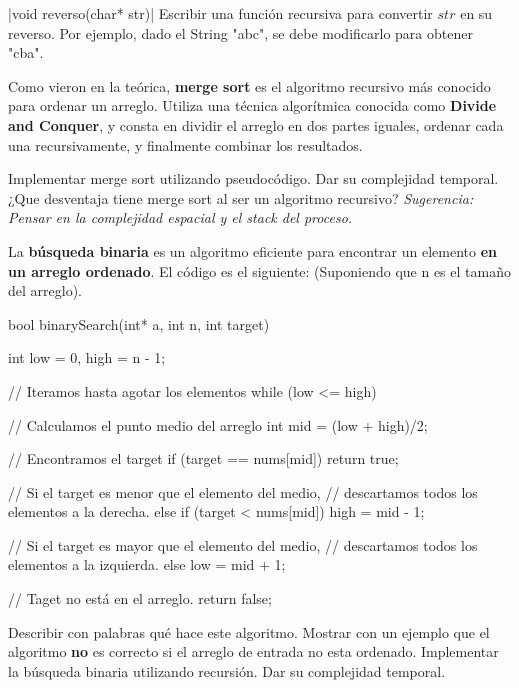 \documentclass[titlepage,oneside]{book}
\begin{document}
	\begin{Exercise}
		|void reverso(char* str)|
        Escribir una función recursiva para convertir $str$ en su reverso. Por ejemplo, dado el String "abc", se debe modificarlo para obtener "cba".
	\end{Exercise}

	\begin{Exercise}
		Como vieron en la teórica, \textbf{merge sort} es el algoritmo recursivo más conocido para ordenar un arreglo. Utiliza una técnica algorítmica conocida como \textbf{Divide and Conquer}, y consta en dividir el arreglo en dos partes iguales, ordenar cada una recursivamente, y finalmente combinar los resultados.

		\Question Implementar merge sort utilizando pseudocódigo. Dar su complejidad temporal.
		\Question ¿Que desventaja tiene merge sort al ser un algoritmo recursivo? \newline\textit{Sugerencia: Pensar en la complejidad espacial y el stack del proceso.}
	\end{Exercise}

\begin{Exercise} La \textbf{búsqueda binaria} es un algoritmo eficiente para encontrar un elemento \textbf{en un arreglo ordenado}. El código es el siguiente: (Suponiendo que n es el tamaño del arreglo).

    \begin{ccode}
    bool binarySearch(int* a, int n, int target)
    {
        int low = 0, high = n - 1;

        // Iteramos hasta agotar los elementos
        while (low <= high)
        {
            // Calculamos el punto medio del arreglo
            int mid = (low + high)/2;

            // Encontramos el target
            if (target == nums[mid]) {
                return true;
            }

            // Si el target es menor que el elemento del medio,
            // descartamos todos los elementos a la derecha.
            else if (target < nums[mid]) {
                high = mid - 1;
            }

            // Si el target es mayor que el elemento del medio,
            // descartamos todos los elementos a la izquierda.
            else {
                low = mid + 1;
            }
        }

    // Taget no está en el arreglo.
    return false;

    }
    \end{ccode}

    \Question Describir con palabras qué hace este algoritmo.
    \Question Mostrar con un ejemplo que el algoritmo \textbf{no} es correcto si el arreglo de entrada no esta ordenado.
    \Question Implementar la búsqueda binaria utilizando recursión. Dar su complejidad temporal.
\end{Exercise}
\end{document}
